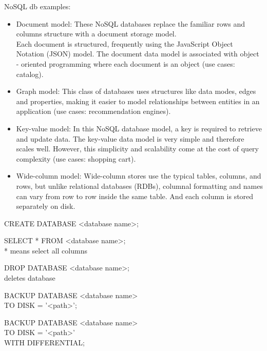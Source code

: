 \documentclass{article}
\begin{document}
    NoSQL db examples:
    \begin{itemize}
        \item Document model:
            These NoSQL databases replace the familiar rows and columns structure with a document storage model. \\
            Each document is structured, frequently using the JavaScript Object Notation (JSON) model.
            The document data model is associated with object - oriented programming 
            where each document is an object (use cases: catalog).
        \item Graph model: This class of databases uses structures like data modes,
            edges and properties, making it easier to model relationships
            between entities in an application (use cases: recommendation engines).
        \item Key-value model: In this NoSQL database model, a key is required to retrieve and update data.
            The key-value data model is very simple and therefore scales well.
            However, this simplicity and scalability come at the cost of query complexity (use cases: shopping cart).
        \item Wide-column model: Wide-column stores use the typical tables, columns,
            and rows, but unlike relational databases (RDBs), columnal formatting 
            and names can vary from row to row inside the same table.
            And each column is stored separately on disk.
    \end{itemize}

    CREATE DATABASE <database name>;

    SELECT * FROM <database name>; \\
    * means select all columns

    DROP DATABASE <database name>; \\
    deletes database

    BACKUP DATABASE <database name> \\
    TO DISK = '<path>';

    BACKUP DATABASE <database name> \\
    TO DISK = '<path>' \\
    WITH DIFFERENTIAL;
\end{document}
